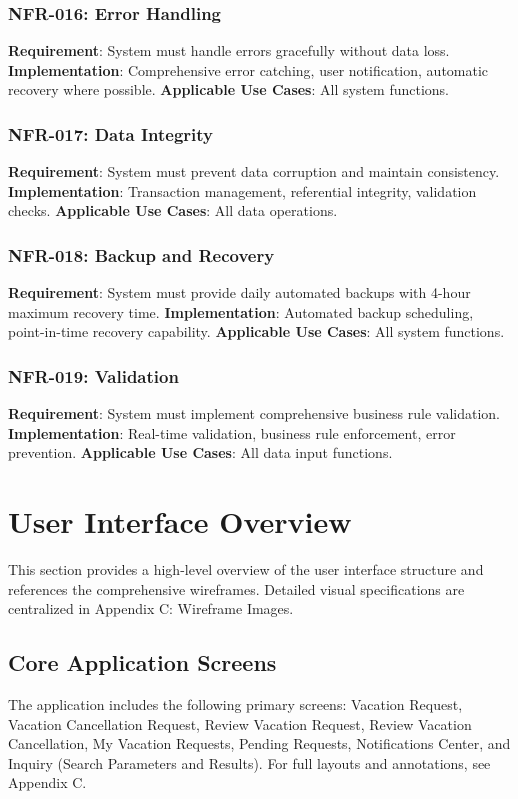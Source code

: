 \documentclass[12pt,a4paper]{article}
\begin{document}
\subsubsection{NFR-016: Error Handling}
\textbf{Requirement}: System must handle errors gracefully without data loss.
\textbf{Implementation}: Comprehensive error catching, user notification, automatic recovery where possible.
\textbf{Applicable Use Cases}: All system functions.

\subsubsection{NFR-017: Data Integrity}
\textbf{Requirement}: System must prevent data corruption and maintain consistency.
\textbf{Implementation}: Transaction management, referential integrity, validation checks.
\textbf{Applicable Use Cases}: All data operations.

\subsubsection{NFR-018: Backup and Recovery}
\textbf{Requirement}: System must provide daily automated backups with 4-hour maximum recovery time.
\textbf{Implementation}: Automated backup scheduling, point-in-time recovery capability.
\textbf{Applicable Use Cases}: All system functions.

\subsubsection{NFR-019: Validation}
\textbf{Requirement}: System must implement comprehensive business rule validation.
\textbf{Implementation}: Real-time validation, business rule enforcement, error prevention.
\textbf{Applicable Use Cases}: All data input functions.

\section{User Interface Overview}

This section provides a high-level overview of the user interface structure and references the comprehensive wireframes. Detailed visual specifications are centralized in Appendix C: Wireframe Images.

\subsection{Core Application Screens}
The application includes the following primary screens: Vacation Request, Vacation Cancellation Request, Review Vacation Request, Review Vacation Cancellation, My Vacation Requests, Pending Requests, Notifications Center, and Inquiry (Search Parameters and Results). For full layouts and annotations, see Appendix C.
\end{document}
